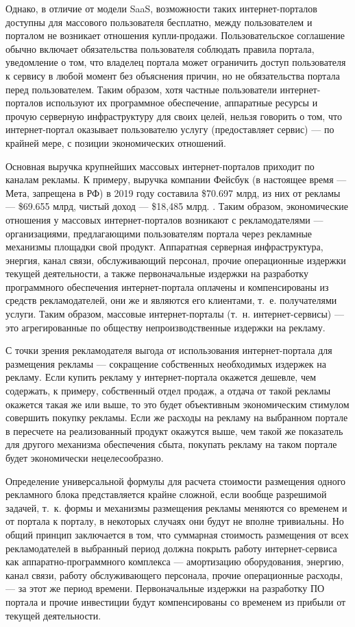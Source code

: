 \documentclass{article}
\begin{document}
Однако, в отличие от модели SaaS, возможности таких интернет-порталов доступны для массового пользователя бесплатно, между пользователем и порталом не возникает отношения купли-продажи. Пользовательское соглашение обычно включает обязательства пользователя соблюдать правила портала, уведомление о том, что владелец портала может ограничить доступ пользователя к сервису в любой момент без объяснения причин, но не обязательства портала перед пользователем. Таким образом, хотя частные пользователи интернет-порталов используют их программное обеспечение, аппаратные ресурсы и прочую серверную инфраструктуру для своих целей, нельзя говорить о том, что интернет-портал оказывает пользователю услугу (предоставляет сервис) — по крайней мере, с позиции экономических отношений.

Основная выручка крупнейших массовых интернет-порталов приходит по каналам рекламы. К примеру, выручка компании Фейсбук (в настоящее время — Мета, запрещена в РФ) в 2019 году составила \$70.697 млрд, из них от рекламы — \$69.655 млрд, чистый доход — \$18,485 млрд. \cite{facebook10K2019}. Таким образом, экономические отношения у массовых интернет-порталов возникают с рекламодателями — организациями, предлагающими пользователям портала через рекламные механизмы площадки свой продукт. Аппаратная серверная инфраструктура, энергия, канал связи, обслуживающий персонал, прочие операционные издержки текущей деятельности, а также первоначальные издержки на разработку программного обеспечения интернет-портала оплачены и компенсированы из средств рекламодателей, они же и являются его клиентами, т.~е. получателями услуги. Таким образом, массовые интернет-порталы (т.~н. интернет-сервисы) — это агрегированные по обществу непроизводственные издержки на рекламу.

С точки зрения рекламодателя выгода от использования интернет-портала для размещения рекламы — сокращение собственных необходимых издержек на рекламу. Если купить рекламу у интернет-портала окажется дешевле, чем содержать, к примеру, собственный отдел продаж, а отдача от такой рекламы окажется такая же или выше, то это будет объективным экономическим стимулом совершить покупку рекламы. Если же расходы на рекламу на выбранном портале в пересчете на реализованный продукт окажутся выше, чем такой же показатель для другого механизма обеспечения сбыта, покупать рекламу на таком портале будет экономически нецелесообразно.

Определение универсальной формулы для расчета стоимости размещения одного рекламного блока представляется крайне сложной, если вообще разрешимой задачей, т.~к. формы и механизмы размещения рекламы меняются со временем и от портала к порталу, в некоторых случаях они будут не вполне тривиальны. Но общий принцип заключается в том, что суммарная стоимость размещения от всех рекламодателей в выбранный период должна покрыть работу интернет-сервиса как аппаратно-программного комплекса — амортизацию оборудования, энергию, канал связи, работу обслуживающего персонала, прочие операционные расходы, — за этот же период времени. Первоначальные издержки на разработку ПО портала и прочие инвестиции будут компенсированы со временем из прибыли от текущей деятельности.
\end{document}
